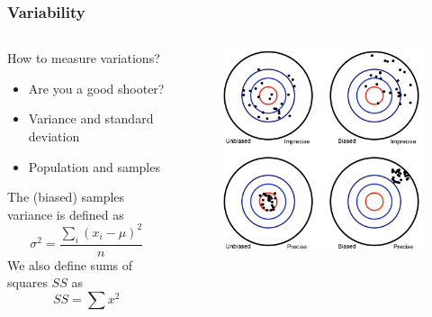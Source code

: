 \documentclass[10pt, compress]{beamer}
\begin{document}
\begin{frame}
    \frametitle{Variability}
    \begin{columns}
        \begin{block}{How to measure variations?}
            \begin{itemize}
                \item \alert{Are you a good shooter?}
                \item Variance and standard deviation
                \item Population and samples
            \end{itemize}
            \smallskip
            The (biased) samples variance is defined as
            \begin{equation}
                \sigma^2 = \frac{\sum_i (x_i - \mu)^2}{n}
            \end{equation}
            We also define sums of squares $SS$ as
            \begin{equation}
                SS = \sum x^2
            \end{equation}
        \end{block}
        \begin{block}{}
            \begin{figure}
                \begin{center}
                    \includegraphics[scale=0.4]{img/std_dvn.png}
                \end{center}
            \end{figure}
        \end{block}
    \end{columns}
\end{frame}
\end{document}
